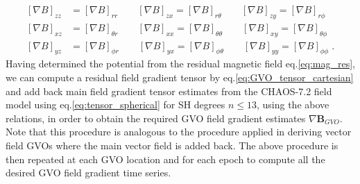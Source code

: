 \documentclass[extra,mreferee]{gji}
\begin{document}
\begin{align}
\left[\nabla B \right]_{zz}&= \left[\nabla B \right]_{rr} \qquad
\left[\nabla B \right]_{zx}=\left[\nabla B \right]_{r \theta} \qquad
\left[\nabla B \right]_{zy}=\left[\nabla B \right]_{r \phi}\\ \nonumber
\left[\nabla B \right]_{xz}&=\left[\nabla B \right]_{\theta r}\qquad
\left[\nabla B \right]_{xx}=\left[\nabla B \right]_{\theta \theta}\qquad
\left[\nabla B \right]_{xy}=\left[\nabla B \right]_{\theta \phi}\\ \nonumber
\left[\nabla B \right]_{yz}&=\left[\nabla B \right]_{\phi r} \qquad
\left[\nabla B \right]_{yx}=\left[\nabla B \right]_{\phi \theta} \qquad
\left[\nabla B \right]_{yy}=\left[\nabla B \right]_{\phi \phi} \;. \nonumber
\end{align}
Having determined the potential from the residual magnetic field eq.\eqref{eq:mag_res}, we can compute a residual field gradient tensor by eq.\eqref{eq:GVO_tensor_cartesian} and add back main field gradient tensor estimates from the CHAOS-7.2 field model using eq.\eqref{eq:tensor_spherical} for SH degrees $n \leq 13$, using the above relations, in order to obtain the required GVO field gradient estimates $\nabla \mathbf{B}_{GVO}$. Note that this procedure is analogous to the procedure applied in deriving vector field GVOs where the main vector field is added back. The above procedure is then repeated at each GVO location and for each epoch to compute all the desired GVO field gradient time series. 
\end{document}
